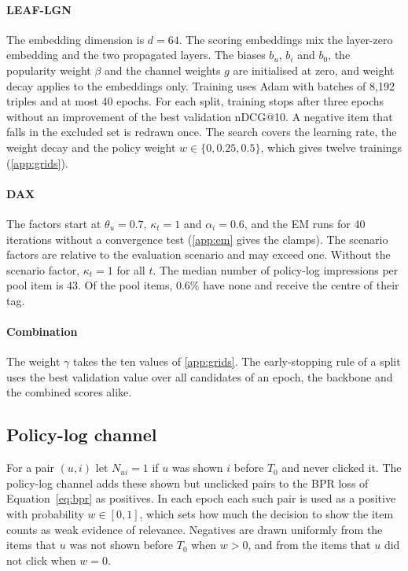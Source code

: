 \paragraph{LEAF-LGN} The embedding dimension is $d=64$. The scoring embeddings mix the layer-zero embedding and the two propagated layers. The biases
$b_u$, $b_i$ and $b_0$, the popularity weight $\beta$ and the channel weights $g$ are initialised at zero, and weight decay applies to the embeddings only.
Training uses Adam with batches of 8,192 triples and at most 40 epochs. For each split, training stops after three epochs without an improvement of the
best validation nDCG@10. A negative item that falls in the excluded set is redrawn once. The search covers the learning rate, the weight decay and the
policy weight $w\in\{0,0.25,0.5\}$, which gives twelve trainings (\ref{app:grids}).

\paragraph{DAX} The factors start at $\theta_u=0.7$, $\kappa_t=1$ and $\alpha_i=0.6$, and the EM runs for 40 iterations without a convergence test
(\ref{app:em} gives the clamps). The scenario factors are relative to the evaluation scenario and may exceed one. Without the scenario factor,
$\kappa_t=1$ for all $t$. The median number of policy-log impressions per pool item is 43. Of the pool items, 0.6\% have none and receive the centre of
their tag.

\paragraph{Combination} The weight $\gamma$ takes the ten values of \ref{app:grids}. The early-stopping rule of a split uses the best validation
value over all candidates of an epoch, the backbone and the combined scores alike.

\subsection{Policy-log channel}\label{app:policy}

For a pair $(u,i)$ let $N_{ui}=1$ if $u$ was shown $i$ before $T_0$ and never clicked it. The policy-log channel adds these shown but unclicked pairs to the
BPR loss of Equation~\eqref{eq:bpr} as positives. In each epoch each such pair is used as a positive with probability $w\in[0,1]$, which sets how much the
decision to show the item counts as weak evidence of relevance. Negatives are drawn uniformly from the items that $u$ was not shown before $T_0$ when
$w>0$, and from the items that $u$ did not click when $w=0$.

